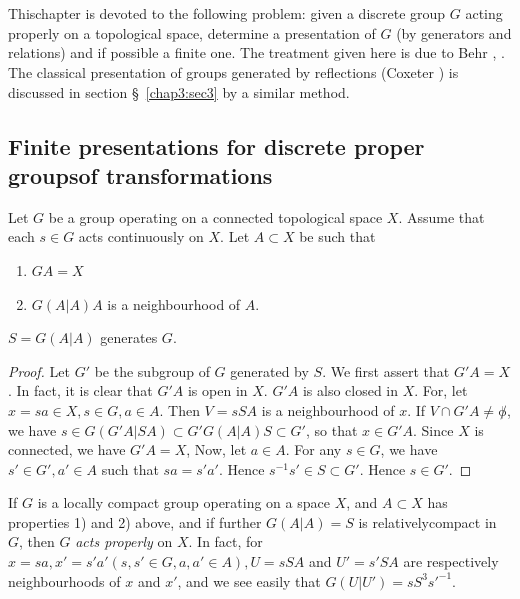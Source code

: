 \chapter{}\label{chap3}%

This\pageoriginale chapter is devoted to the following problem: given a discrete\break
group $G$ acting properly on a topological space, determine a
presentation of $G$ (by generators and relations) and if possible a
finite one. The treatment given here is due to Behr \cite{key1}, \cite{key2}. The
classical presentation of groups generated by reflections (Coxeter
\cite{key1}) is discussed in section \S\ \ref{chap3:sec3} by a similar method. 

\section[Finite presentations for discrete proper groups....]{Finite presentations for discrete proper groups\hfill\break of transformations}\label{chap3:sec1}%

Let $G$ be a group operating on a connected topological space
$X$. Assume that each $s\in G$ acts continuously on $X$. Let $A
\subset X$ be such that  
\begin{enumerate}[(1)]
\item $GA = X$
\item $G(A | A) A$ is a neighbourhood of $A$.
\end{enumerate}

\begin{prop*}
  $S = G(A|A)$ generates $G$.
\end{prop*}

\begin{proof}
  Let $G'$ be the subgroup of $G$ generated by $S$. We first assert that
  $G'A = X$. In fact, it is clear that $G'A$ is open in $X$. $G'A$ is
  also closed in $X$. For, let $x = sa \in X, s \in G, a \in A$. Then $V
  = sSA$ is a neighbourhood of $x$. If $V \cap G'A \neq \not\phi$, we
  have $s \in G(G'A|SA) \subset G' G(A | A) S \subset G'$, so that $x \in
  G'A$. Since $X$ is connected, we have $G' A = X$, Now, let $a \in
  A$. For any $s \in G$, we have $s' \in G', a' \in A$ such that $sa =
  s' a'$. Hence $s^{-1} s' \in S \subset G'$. Hence $s \in G'$. 
\end{proof}

\begin{remark*} 
  If $G$ is a locally compact group operating on a
  space $X$, and $A \subset X$ has properties 1) and 2) above, and
  if further $G (A | A) = S$ is relatively\pageoriginale compact in $G$, then $G$
  \textit{acts properly} on $X$. In fact, for $x = sa, x' = s' a' (s, s'
  \in G, a, a' \in A), U = s SA$ and $U' = s' SA$ are respectively
  neighbourhoods of $x$ and $x'$, and we see easily that $G(U | U') = s
  S^3 s'^{-1}$. 
\end{remark*}

